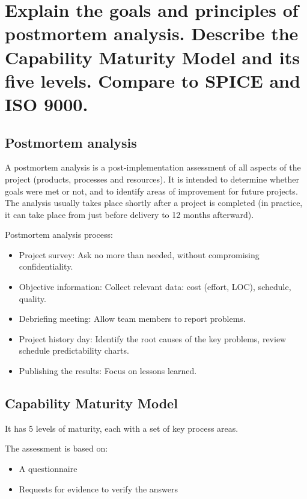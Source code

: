 \clearpage{}
\section{Explain the goals and principles of postmortem analysis. Describe
the Capability Maturity Model and its five levels. Compare to SPICE and ISO
9000.}

\subsection{Postmortem analysis}

A postmortem analysis is a post-implementation assessment of all aspects of the
project (products, processes and resources). It is intended to determine whether
goals were met or not, and to identify areas of improvement for future projects.
\newline
The analysis usually takes place shortly after a project is completed (in
practice, it can take place from just before delivery to 12 months afterward).
\newline

Postmortem analysis process:

\begin{itemize}
    \item Project survey: Ask no more than needed, without compromising confidentiality.
    \item Objective information: Collect relevant data: cost (effort, LOC), schedule, quality.
    \item Debriefing meeting: Allow team members to report problems.
    \item Project history day: Identify the root causes of the key problems, review schedule predictability charts.
    \item Publishing the results: Focus on lessons learned.
\end{itemize}

\subsection{Capability Maturity Model}

It has 5 levels of maturity, each with a set of key process areas. \newline

The assessment is based on:

\begin{itemize}
    \item A questionnaire
    \item Requests for evidence to verify the answers
\end{itemize}

